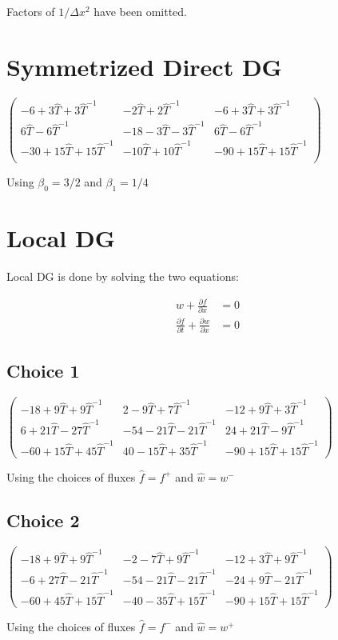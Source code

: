 \documentclass[10pt,letterpaper]{article}
\begin{document}
Factors of $1/\Delta x^2$ have been omitted.

\section{Symmetrized Direct DG}
$\left(
\begin{array}{ccc}
 -6+3 \hat{T}+3 \hat{T}^{-1} & -2 \hat{T}+2 \hat{T}^{-1} & -6+3 \hat{T}+3 \hat{T}^{-1} \\
 6 \hat{T}-6 \hat{T}^{-1} & -18-3 \hat{T}-3 \hat{T}^{-1} & 6 \hat{T}-6 \hat{T}^{-1} \\
 -30+15 \hat{T}+15 \hat{T}^{-1} & -10 \hat{T}+10 \hat{T}^{-1} & -90+15 \hat{T}+15 \hat{T}^{-1} \\
\end{array}
\right)$

Using $\beta_0 = 3/2$ and $\beta_1 = 1/4$

\section{Local DG}
Local DG is done by solving the two equations:

\begin{align*}
w + \frac{\partial f}{\partial x} &= 0\\
\frac{\partial f}{\partial t} + \frac{\partial w}{\partial x} &= 0
\end{align*}

\subsection{Choice 1}
$\left(
\begin{array}{ccc}
 -18+9 \hat{T}+9 \hat{T}^{-1}& 2-9 \hat{T}+7 \hat{T}^{-1}& -12+9 \hat{T}+3 \hat{T}^{-1}\\
 6+21 \hat{T}-27 \hat{T}^{-1}& -54-21 \hat{T}-21 \hat{T}^{-1}& 24+21 \hat{T}-9 \hat{T}^{-1}\\
 -60+15 \hat{T}+45 \hat{T}^{-1}& 40-15 \hat{T}+35 \hat{T}^{-1}& -90+15 \hat{T}+15 \hat{T}^{-1}
\end{array}
\right)$

Using the choices of fluxes $\hat{f} = f^+$ and $\hat{w} = w^-$

\subsection{Choice 2}
$\left(
\begin{array}{ccc}
 -18+9 \hat{T}+9 \hat{T}^{-1}& -2-7 \hat{T}+9 \hat{T}^{-1}& -12+3 \hat{T}+9 \hat{T}^{-1}\\
 -6+27 \hat{T}-21 \hat{T}^{-1}& -54-21 \hat{T}-21 \hat{T}^{-1}& -24+9 \hat{T}-21 \hat{T}^{-1}\\
 -60+45 \hat{T}+15 \hat{T}^{-1}& -40-35 \hat{T}+15 \hat{T}^{-1}& -90+15 \hat{T}+15 \hat{T}^{-1}
\end{array}
\right)$

Using the choices of fluxes $\hat{f} = f^-$ and $\hat{w} = w^+$
\end{document}
